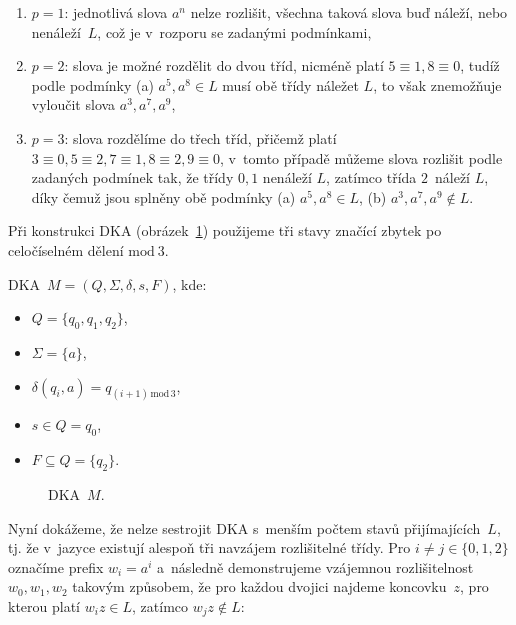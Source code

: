 \documentclass[a4paper, 11pt]{article}
\begin{document}
\begin{enumerate}
    \item $p = 1$: jednotlivá slova $a^n$ nelze rozlišit, všechna taková slova buď náleží, nebo nenáleží~$L$, což je v~rozporu se zadanými podmínkami,
    \item $p = 2$: slova je možné rozdělit do dvou tříd, nicméně platí $5 \equiv 1, 8 \equiv 0$, tudíž podle podmínky (a) $a^5, a^8 \in L$ musí obě třídy náležet $L$, to však znemožňuje vyloučit slova $a^3, a^7, a^9$,
    \item $p = 3$: slova rozdělíme do třech tříd, přičemž platí $3 \equiv 0, 5 \equiv 2, 7 \equiv 1, 8 \equiv 2, 9 \equiv 0$, v~tomto případě můžeme slova rozlišit podle zadaných podmínek tak, že třídy $0, 1$ nenáleží $L$, zatímco třída $2$~náleží $L$, díky čemuž jsou splněny obě podmínky (a) $a^5, a^8 \in L$, (b) $a^3, a^7, a^9 \notin L$.
\end{enumerate}

Při konstrukci DKA (obrázek~\ref{dka-m}) použijeme tři stavy značící zbytek po celočíselném dělení $\mathrm{mod}~3$.

DKA~$M = \left( Q, \Sigma, \delta, s, F \right)$, kde:

\begin{itemize}
    \item $Q = \{ q_0, q_1, q_2 \}$,
    \item $\Sigma = \{ a \}$,
    \item $\delta\left( q_i, a \right) = q_{(i + 1)\,\mathrm{mod}\,3}$,
    \item $s \in Q = q_0$,
    \item $F \subseteq Q = \{ q_2 \}$.
\end{itemize}

\begin{figure}[ht]
    \centering
    \caption{DKA~$M$.}
    \label{dka-m}
\end{figure}

Nyní dokážeme, že nelze sestrojit DKA s~menším počtem stavů přijímajících~$L$, tj. že v~jazyce existují alespoň tři navzájem rozlišitelné třídy.
Pro $i \neq j \in \{ 0, 1, 2 \}$ označíme prefix $w_i = a^i$ a~následně demonstrujeme vzájemnou rozlišitelnost $w_0, w_1, w_2$ takovým způsobem, že pro každou dvojici najdeme koncovku~$z$, pro kterou platí $w_iz \in L$, zatímco $w_jz \notin L$:
\end{document}
